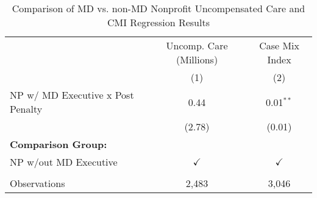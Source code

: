 \begin{table}[htbp]
   \caption{\label{tab:MD_noMD_uncomp_CMI_fullsample} Comparison of MD vs. non-MD Nonprofit Uncompensated Care and CMI Regression Results}
   \bigskip
   \centering
   \begin{tabular}{lcc}
      \toprule
                                        & Uncomp. Care (Millions) & Case Mix Index\\  
                                        & (1)                     & (2)\\  
      \midrule 
      NP w/ MD Executive x Post Penalty & 0.44                    & 0.01$^{**}$\\   
                                        & (2.78)                  & (0.01)\\   
      \textbf{Comparison Group:}        &                         & \\  
      NP w/out MD Executive             & $\checkmark$            & $\checkmark$\\   
       \\
      Observations                      & 2,483                   & 3,046\\  
      \bottomrule
   \end{tabular}
\end{table}
